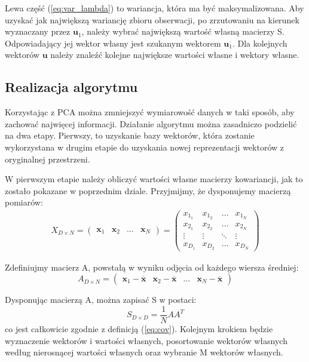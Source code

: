 \documentclass[oneside, eng]{mgr}
\newcommand{\bb}{\textbf}
\begin{document}
Lewa część (\ref{eq:var_lambda}) to wariancja, która ma być maksymalizowana. Aby uzyskać jak największą wariancję zbioru obserwacji, po zrzutowaniu na kierunek wyznaczany przez $\bb{u}_1$, należy wybrać największą wartość własną macierzy S. Odpowiadający jej wektor własny jest szukanym wektorem $\bb{u}_1$. Dla kolejnych wektorów $\bb{u}$ należy znaleźć kolejne największe wartości własne i wektory własne.

\subsection{Realizacja algorytmu}  \label{Realizacja algorytmu}
Korzystając z PCA można zmniejszyć wymiarowość danych w taki sposób, aby zachować najwięcej informacji. Działanie algorytmu można zasadniczo podzielić na dwa etapy. Pierwszy, to uzyskanie bazy wektorów, która zostanie wykorzystana w drugim etapie do uzyskania nowej reprezentacji wektorów z oryginalnej przestrzeni.

W pierwszym etapie należy obliczyć wartości własne macierzy kowariancji, jak to zostało pokazane w poprzednim dziale. Przyjmijmy, że dysponujemy macierzą pomiarów:
\begin{align}
	X_{D \times N} = 
	\left( \begin{array}{llll}
		\bb{x}_1 & \bb{x}_2 & \ldots & \bb{x}_N
	\end{array} \right)	
	=
	\left( \begin{array}{llll}
		x_{1_1} & x_{1_2} & \ldots & x_{1_N} \\
		x_{2_1} & x_{2_2} & \ldots & x_{2_N} \\
		\vdots  & \vdots  & \ddots & \vdots  \\
		x_{D_1} & x_{D_2} & \ldots & x_{D_N}
	\end{array} \right)
\end{align}

Zdefiniujmy macierz A, powstałą w wyniku odjęcia od każdego wiersza średniej:
\begin{equation}
	A_{D \times N} = 
	\left( \begin{array}{llll}
	\bb{x}_1 - \overline{\bb{x}} & \bb{x}_2 - \overline{\bb{x}} & \ldots & \bb{x}_N - \overline{\bb{x}}
	\end{array} \right)
\end{equation}


Dysponując macierzą A, można zapisać S w postaci:
\begin{equation}
	S_{D \times D} = \frac{1}{N} A A^T
\end{equation}
co jest całkowicie zgodnie z definicją (\ref{eq:cov}). Kolejnym krokiem będzie wyznaczenie wektorów i wartości własnych, posortowanie wektorów własnych według nierosnącej wartości własnych oraz wybranie M wektorów własnych. 
\end{document}
